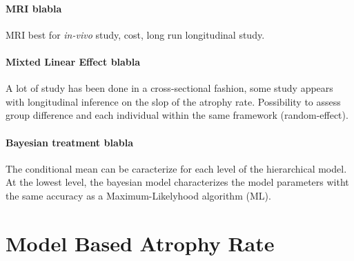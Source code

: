 \documentclass[final, paper=letter,5p,times,twocolumn]{elsarticle}
\theoremstyle{definition}
\begin{document}
\paragraph{MRI blabla}{MRI best for {\it in-vivo} study, cost, long run longitudinal study.}

\paragraph{Mixted Linear Effect blabla}{A lot of study has been done in a cross-sectional fashion, some study appears with longitudinal inference on the slop of the atrophy rate. Possibility to assess group difference and each individual within the same framework (random-effect).}

\paragraph{Bayesian treatment blabla}{The conditional mean can be caracterize for each level of the hierarchical model. At the lowest level, the bayesian model characterizes the model parameters witht the same accuracy as a Maximum-Likelyhood algorithm (ML).}


\section{Model Based Atrophy Rate}
\end{document}
